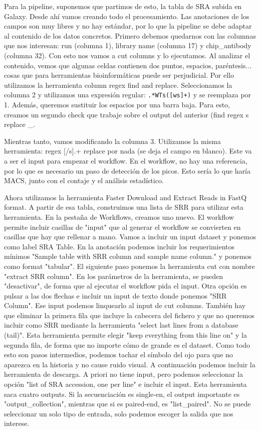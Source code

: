 Para la pipeline, suponemos que partimos de esto, la tabla de SRA subida en Galaxy. Desde ahí vamos creando todo el procesamiento. Las anotaciones de los campos son muy libres y no hay estándar, por lo que la pipeline se debe adaptar al contenido de los datos concretos. Primero debemos quedarnos con las columnas que nos interesan: run (columna 1), library name (columna 17) y chip\_antibody (columna 32). Con esto nos vamos a cut columns y lo ejecutamos. Al analizar el contenido, vemos que algunas celdas contienen dos puntos, espacios, paréntesis... cosas que para herramientas bioinformáticas puede ser perjudicial. Por ello utilizamos la herramienta column regex find and replace. Seleccionamos la columna 2 y utilizamos una expresión regular: \texttt{.*WTs([ws]+)} y se reemplaza por 1. Además, queremos sustituir los espacios por una barra baja. Para esto, creamos un segundo check que trabaje sobre el output del anterior (find regex s replace \_.

Mientras tanto, vamos modificando la columna 3. Utilizamos la misma herramienta: regex [/s].+ replace por nada (se deja el campo en blanco). Este va a ser el input para empezar el workflow. En el workflow, no hay una referencia, por lo que es necesario un paso de detección de los picos. Esto sería lo que haría MACS, junto con el contaje y el análisis estadístico.

Ahora utilizamos la herramienta Faster Download and Extract Reads in FastQ format. A partir de esa tabla, construimos una lista de SRR para utilizar esta herramienta. En la pestaña de Workflows, creamos uno nuevo. El workflow permite incluir casillas de "input" que al generar el workflow se convierten en casillas que hay que rellenar a mano. Vamos a incluir un input dataset y ponemos como label SRA Table. En la anotación podemos incluir los requerimientos mínimos "Sample table with SRR column and sample name column." y ponemos como format "tabular". El siguiente paso ponemos la herramienta cut con nombre "extract SRR column". En los parámetros de la herramienta, se pueden "desactivar", de forma que al ejecutar el workflow pida el input. Otra opción es pulsar a las dos flechas e incluir un input de texto donde ponemos "SRR Column". Ese input podemos linquearlo al input de cut columns. También hay que eliminar la primera fila que incluye la cabecera del fichero y que no queremos incluir como SRR mediante la herramienta "select last lines from a database (tail)". Esta herramienta permite elegir "keep everything from this line on" y la segunda fila, de forma que no importe cómo de grande es el dataset. Como todo esto son pasos intermedios, podemos tachar el símbolo del ojo para que no aparezca en la historia y no cause ruido visual. A continuación podemos incluir la herramienta de descarga. A priori no tiene input, pero podemos seleccionar la opción "list of SRA accession, one per line" e incluir el input. Esta herramienta saca cuatro outputs. Si la secuenciación es single-en, el output importante es "output\_collection", mientras que si es paired-end, es "list\_paired". No se puede seleccionar un solo tipo de entrada, solo podemos escoger la salida que nos interese.

